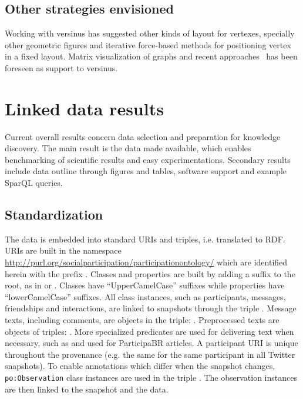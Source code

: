 \subsection{Other strategies envisioned}\label{sec:other}
Working with versinus has suggested other kinds of layout for vertexes, specially other geometric figures and iterative force-based methods for positioning vertex in a fixed layout. Matrix visualization of graphs and recent approaches~\cite{Viz1} has been foreseen as support to versinus.


\section{Linked data results}
\label{outline}
Current overall results concern data selection and preparation for knowledge discovery.
The main result is the data made available, which enables benchmarking of scientific results
and easy experimentations.
Secondary results include data outline through figures and tables,
software support and example SparQL queries.

\subsection{Standardization}
The data is embedded into standard URIs and triples, i.e. translated to RDF.
URIs are built in the namespace \url{http://purl.org/socialparticipation/participationontology/}
which are identified herein with the prefix .
Classes and properties are built by adding a suffix to the root, as in  or .
Classes have ``UpperCamelCase'' suffixes while properties have ``lowerCamelCase'' suffixes.
All class instances, such as participants, messages, friendships and
interactions, are linked to
snapshots through the triple .
Message texts, including comments, are objects in the triple: .
Preprocessed texts are objects of triples: .
More specialized predicates are used for delivering text when necessary,
such as  and  used
for ParticipaBR articles.
A participant URI is unique throughout the provenance (e.g. the same for
the same participant in all Twitter snapshots).
To enable annotations which differ when the snapshot changes,
\texttt{po:Observation} class instances are used in the triple
.
The observation instances are then linked to the snapshot and the
data.

